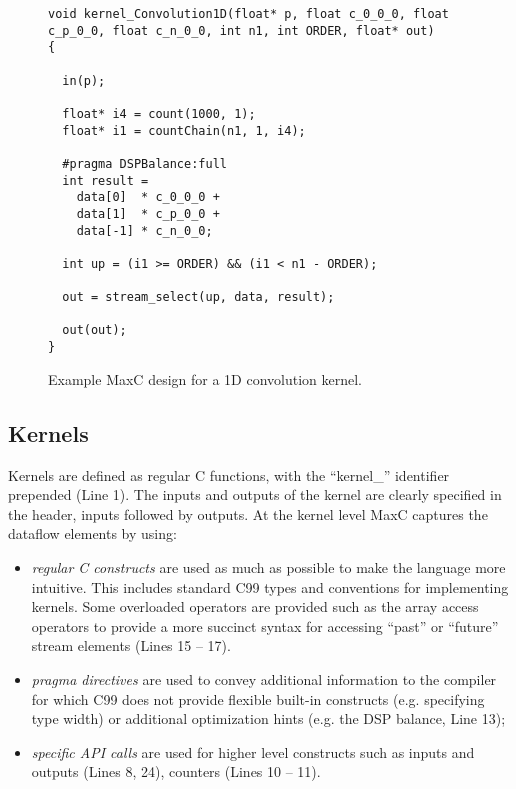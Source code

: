 \lstset{style=MaxC}

\begin{figure}
\begin{lstlisting}
void kernel_Convolution1D(float* p, float c_0_0_0, float c_p_0_0, float c_n_0_0, int n1, int ORDER, float* out)
{

  in(p);

  float* i4 = count(1000, 1);
  float* i1 = countChain(n1, 1, i4);

  #pragma DSPBalance:full
  int result =
    data[0]  * c_0_0_0 +
    data[1]  * c_p_0_0 +
    data[-1] * c_n_0_0;

  int up = (i1 >= ORDER) && (i1 < n1 - ORDER);

  out = stream_select(up, data, result);

  out(out);
}
\end{lstlisting}
\caption{Example MaxC design for a 1D convolution kernel.}
\label{fig:maxc-1dconv}
\end{figure}

\subsection{Kernels}

Kernels are defined as regular C functions, with the ``kernel\_''
identifier prepended (Line 1). The inputs and outputs of the kernel
are clearly specified in the header, inputs followed by outputs. At
the kernel level MaxC captures the dataflow elements by using:

\begin{itemize}
\item \emph{regular C constructs} are used as much as possible to make
  the language more intuitive. This includes standard C99 types and
  conventions for implementing kernels. Some overloaded operators are
  provided such as the array access operators to provide a more
  succinct syntax for accessing ``past'' or ``future'' stream elements
  (Lines 15 -- 17).

\item \emph{pragma directives} are used to convey additional
  information to the compiler for which C99 does not provide flexible
  built-in constructs (e.g. specifying type width) or additional
  optimization hints (e.g. the DSP balance, Line 13);

\item \emph{specific API calls} are used for higher level constructs
  such as inputs and outputs (Lines 8, 24), counters (Lines 10 -- 11).

\end{itemize}


